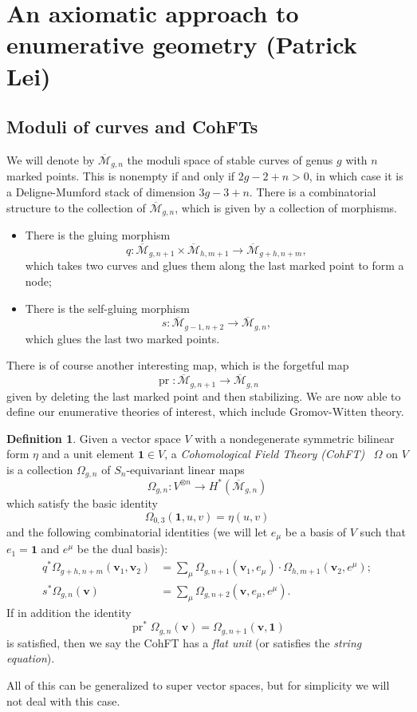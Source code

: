 \documentclass[10pt]{amsart}
\theoremstyle{definition}
\newtheorem{defn}[thm]{Definition}
\theoremstyle{remark}
\theoremstyle{plain}
\theoremstyle{definition}
\theoremstyle{remark}
\newcommand{\Mbar}{\overline{\mathcal{M}}}
\newcommand{\mbf}[1]{\mathbf{#1}}
\newcommand{\bv}{\mbf{v}}
\newcommand{\1}{\mathbf{1}}
\newcommand{\2}{\mathbf{2}}
\newcommand{\3}{\mathbf{3}}
\DeclareMathOperator{\pr}{pr}
\begin{document}
\section{An axiomatic approach to enumerative geometry (Patrick Lei)}%
\label{sec:An axiomatic approach to enumerative geometry (Patrick Lei)}

\subsection{Moduli of curves and CohFTs}%
\label{sub:Moduli of curves and CohFTs}

We will denote by $\Mbar_{g,n}$ the moduli space of stable curves of genus $g$ with $n$ marked points. This is nonempty if and only if $2g-2+n > 0$, in which case it is a Deligne-Mumford stack of dimension $3g-3+n$. There is a combinatorial structure to the collection of $\Mbar_{g,n}$, which is given by a collection of morphisms.
\begin{itemize}
    \item There is the gluing morphism 
        \[q \colon \Mbar_{g,n+1} \times \Mbar_{h, m+1} \to \Mbar_{g+h,n+m}, \] 
        which takes two curves and glues them along the last marked point to form a node;
    \item There is the self-gluing morphism \[s \colon \Mbar_{g-1,n+2} \to \Mbar_{g,n},\] 
        which glues the last two marked points.
\end{itemize} 
There is of course another interesting map, which is the forgetful map
\[ \pr \colon \Mbar_{g,n+1} \to \Mbar_{g,n} \]
given by deleting the last marked point and then stabilizing. We are now able to define our enumerative theories of interest, which include Gromov-Witten theory.

\begin{defn}
    Given a vector space $V$ with a nondegenerate symmetric bilinear form $\eta$ and a unit element $\1 \in V$, a \textit{Cohomological Field Theory (CohFT)}~\cite{km94} $\Omega$ on $V$ is a collection $\Omega_{g,n}$ of $S_n$-equivariant linear maps
    \[ \Omega_{g,n} \colon V^{\otimes n} \to H^*(\Mbar_{g,n}) \]
    which satisfy the basic identity
    \[ \Omega_{0,3}(\1, u,v) = \eta(u,v) \]
    and the following combinatorial identities (we will let $e_{\mu}$ be a basis of $V$ such that $e_1 = \1$ and $e^{\mu}$ be the dual basis):
    \begin{align*}
        q^* \Omega_{g+h,n+m}(\bv_1, \bv_2) &= \sum_{\mu} \Omega_{g,n+1}(\bv_1, e_{\mu}) \cdot \Omega_{h,m+1}(  \bv_2, e^{\mu} ); \\
        s^* \Omega_{g,n}(\bv) &= \sum_{\mu} \Omega_{g,n+2}(\bv, e_{\mu}, e^{\mu}).
    \end{align*}
    If in addition the identity
    \[ \pr^*\Omega_{g,n}(\bv) = \Omega_{g,n+1}(\bv,\1) \]
    is satisfied, then we say the CohFT has a \textit{flat unit} (or satisfies the \textit{string equation}).
\end{defn}
All of this can be generalized to super vector spaces, but for simplicity we will not deal with this case.
\end{document}
